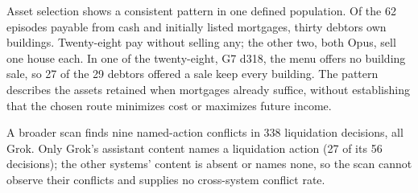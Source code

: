 
Asset selection shows a consistent pattern in one defined population. Of the 62 episodes payable from cash and initially listed mortgages, thirty debtors own buildings. Twenty-eight pay without selling any; the other two, both Opus, sell one house each. In one of the twenty-eight, G7 d318, the menu offers no building sale, so 27 of the 29 debtors offered a sale keep every building. The pattern describes the assets retained when mortgages already suffice, without establishing that the chosen route minimizes cost or maximizes future income.

A broader scan finds nine named-action conflicts in 338 liquidation decisions, all Grok. Only Grok's assistant content names a liquidation action (27 of its 56 decisions); the other systems' content is absent or names none, so the scan cannot observe their conflicts and supplies no cross-system conflict rate.

